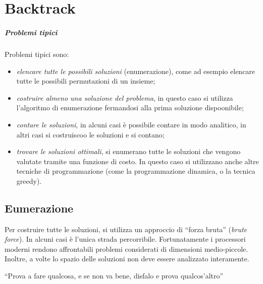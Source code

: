 
\ifsubfile
\usepackage{../settings/subfile}
\setcounter{chapter}{16}


\fi
\chapter{Backtrack}

\paragraph{Problemi tipici}
Problemi tipici sono:
\begin{itemize}
	\item \emph{elencare tutte le possibili soluzioni} (enumerazione), come ad esempio elencare tutte le possibili permutazioni di un insieme;
	\item \emph{costruire almeno una soluzione del problema}, in questo caso si utilizza l'algoritmo di enumerazione fermandosi alla prima soluzione dispoonibile;
	\item \emph{contare le soluzioni}, in alcuni casi è possibile contare in modo analitico, in altri casi si costruiscoo le soluzioni e si contano;
	\item \emph{trovare le soluzioni ottimali}, si enumerano tutte le soluzioni che vengono valutate tramite una funzione di costo.
	 	In questo caso si utilizzano anche altre tecniche di programmazione (come la programmazione dinamica, o la tecnica greedy).
\end{itemize}

\section{Eumerazione}

Per costruire tutte le soluzioni, si utilizza un approccio di \enquote{forza bruta} (\emph{brute force}).
In alcuni casi è l'unica strada percorribile.
Fortunatamente i processori moderni rendono affrontabili problemi considerati di dimensioni medio-piccole.
Inoltre, a volte lo spazio delle soluzioni non deve essere analizzato interamente.

\begin{idea}[backtracking]
\enquote{Prova a fare qualcosa, e se non va bene, disfalo e prova qualcos'altro}
\end{idea}

